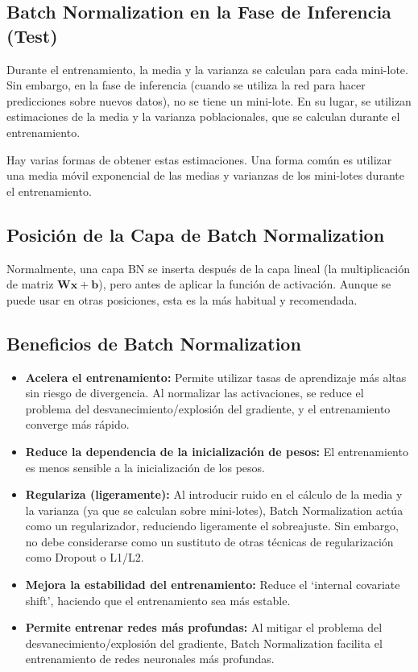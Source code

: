 \documentclass{article}
\begin{document}
\subsection{Batch Normalization en la Fase de Inferencia (Test)}

Durante el entrenamiento, la media y la varianza se calculan para cada mini-lote.  Sin embargo, en la fase de inferencia (cuando se utiliza la red para hacer predicciones sobre nuevos datos), no se tiene un mini-lote.  En su lugar, se utilizan estimaciones de la media y la varianza poblacionales, que se calculan durante el entrenamiento.

Hay varias formas de obtener estas estimaciones.  Una forma común es utilizar una media móvil exponencial de las medias y varianzas de los mini-lotes durante el entrenamiento.

\subsection{Posición de la Capa de Batch Normalization}
Normalmente, una capa BN se inserta después de la capa lineal (la multiplicación de matriz \(\mathbf{W}\mathbf{x} + \mathbf{b}\)), pero antes de aplicar la función de activación. Aunque se puede usar en otras posiciones, esta es la más habitual y recomendada.

\subsection{Beneficios de Batch Normalization}

\begin{itemize}
    \item \textbf{Acelera el entrenamiento:} Permite utilizar tasas de aprendizaje más altas sin riesgo de divergencia.  Al normalizar las activaciones, se reduce el problema del desvanecimiento/explosión del gradiente, y el entrenamiento converge más rápido.
    \item \textbf{Reduce la dependencia de la inicialización de pesos:} El entrenamiento es menos sensible a la inicialización de los pesos.
    \item \textbf{Regulariza (ligeramente):}  Al introducir ruido en el cálculo de la media y la varianza (ya que se calculan sobre mini-lotes), Batch Normalization actúa como un regularizador, reduciendo ligeramente el sobreajuste.  Sin embargo, no debe considerarse como un sustituto de otras técnicas de regularización como Dropout o L1/L2.
    \item \textbf{Mejora la estabilidad del entrenamiento:}  Reduce el `internal covariate shift', haciendo que el entrenamiento sea más estable.
    \item \textbf{Permite entrenar redes más profundas:} Al mitigar el problema del desvanecimiento/explosión del gradiente, Batch Normalization facilita el entrenamiento de redes neuronales más profundas.
\end{itemize}
\end{document}
